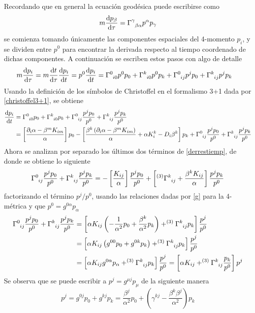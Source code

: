\documentclass[11pt,twoside,openright,spanish]{report}
\numberwithin{equation}{chapter}
\numberwithin{figure}{chapter}
\numberwithin{table}{chapter}
\begin{document}
Recordando que en general la ecuación geodésica puede escribirse como
\begin{equation}
m\frac{\text{d}p_\beta}{\text{d}\tau}=\tensor{\Gamma}{^\gamma_\beta_\alpha}p^\alpha p_\gamma
\label{geodesica}
\end{equation}
se comienza tomando únicamente las componentes espaciales del 4-momento $p_i$, y se dividen entre $p^0$ para encontrar la derivada respecto al tiempo coordenado de dichas componentes. A continuación se escriben estos pasos con algo de detalle
\begin{align}
m\frac{\text{d}p_i}{\text{d}\tau}&=m\frac{\text{d}t}{\text{d}\tau}\frac{\text{d}p_i}{\text{d}t}=p^0\frac{\text{d}p_i}{\text{d}t}=\tensor{\Gamma}{^0_i_0}p^0p_0+\tensor{\Gamma}{^k_i_0}p^0p_k+\tensor{\Gamma}{^0_i_j}p^jp_0+\tensor{\Gamma}{^k_i_j}p^jp_k
\end{align}
Usando la definición de los símbolos de Christoffel en el formalismo 3+1 dada por \eqref{christoffel3+1}, se obtiene
\begin{align}
\nonumber \frac{\text{d}p_i}{\text{d}t}&=\tensor{\Gamma}{^0_i_0}p_0+\tensor{\Gamma}{^k_i_0}p_k+\tensor{\Gamma}{^0_i_j}\frac{p^jp_0}{p^0}+\tensor{\Gamma}{^k_i_j}\frac{p^jp_k}{p^0}\\
&=\left[\frac{\partial_i\alpha-\beta^mK_{im}}{\alpha}\right]p_0-\left[\frac{\beta^k\left(\partial_i\alpha-\beta^mK_{im}\right)}{\alpha}+\alpha K_i^k-D_i\beta^k\right]p_k+\tensor{\Gamma}{^0_i_j}\frac{p^jp_0}{p^0}+\tensor{\Gamma}{^k_i_j}\frac{p^jp_k}{p^0}
\label{derrestiemp}
\end{align}
Ahora se analizan por separado los últimos dos términos de \eqref{derrestiemp}, de donde se obtiene lo siguiente
\begin{align}
\tensor{\Gamma}{^0_i_j}\frac{p^jp_0}{p^0}+\tensor{\Gamma}{^k_i_j}\frac{p^jp_k}{p^0}=-\left[\frac{K_{ij}}{\alpha}\right]\frac{p^jp_0}{p^0}+\left[^{(3)}\tensor{\Gamma}{^k_i_j}+\frac{\beta^k K_{ij}}{\alpha}\right]\frac{p^jp_k}{p^0}
\end{align}
factorizando el término $p^j/p^0$, usando las relaciones dadas por \eqref{g} para la 4-métrica y que $p^0=g^{0\alpha}p_\alpha$
\begin{align*}
\tensor{\Gamma}{^0_i_j}\frac{p^jp_0}{p^0}+\tensor{\Gamma}{^k_i_j}\frac{p^jp_k}{p^0}&=\left[\alpha K_{ij}\left(-\frac{1}{\alpha^2}p_0+\frac{\beta^k}{\alpha^2}p_k\right)+^{(3)}\tensor{\Gamma}{^k_i_j}p_k\right]\frac{p^j}{p^0}\\
&=\left[\alpha K_{ij}\left(g^{00}p_0+g^{0k}p_k\right)+^{(3)}\tensor{\Gamma}{^k_i_j}p_k\right]\frac{p^j}{p^0}\\
&=\left[\alpha K_{ij}g^{0\alpha}p_\alpha+^{(3)}\tensor{\Gamma}{^k_i_j}p_k\right]\frac{p^j}{p^0}=\left[\alpha K_{ij}+^{(3)}\tensor{\Gamma}{^k_i_j}\frac{p_k}{p^0}\right]p^j
\end{align*}
Se observa que se puede escribir a $p^j=g^{\mu j}p_\mu$ de la siguiente manera
\begin{equation*}
p^j=g^{0j}p_0+g^{kj}p_k=\frac{\beta^j}{\alpha^2}p_0+\left(\gamma^{kj}-\frac{\beta^k\beta^j}{\alpha^2}\right)p_k
\end{equation*}
\end{document}
